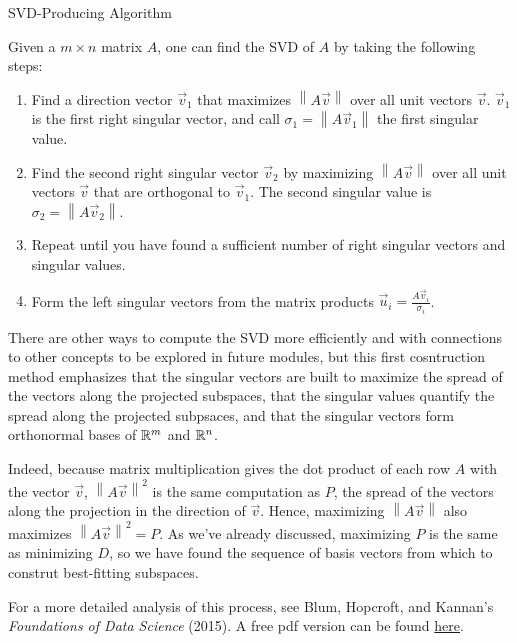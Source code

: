 \documentclass{ximera}
\begin{document}
\begin{theorem}{SVD-Producing Algorithm}

  Given a $m\times n$ matrix $A$, one can find the SVD of $A$ by taking the following steps:

  \begin{enumerate}
    \item Find a direction vector $\vec{v}_1$ that maximizes $\left\|A\vec{v}\right\|$ over all unit vectors $\vec{v}$. $\vec{v}_1$ is the first right singular vector, and call $\sigma_1=\left\|A\vec{v}_1\right\|$ the first singular value. 
    \item Find the second right singular vector $\vec{v}_2$ by maximizing $\left\|A\vec{v}\right\|$ over all unit vectors $\vec{v}$ that are orthogonal to $\vec{v}_1$. The second singular value is $\sigma_2=\left\|A\vec{v}_2\right\|$. 
    \item Repeat until you have found a sufficient number of right singular vectors and singular values.
    \item Form the left singular vectors from the matrix products $\vec{u}_i=\frac{A\vec{v}_i}{\sigma_i}$.
  \end{enumerate}

  There are other ways to compute the SVD more efficiently and with connections to other concepts to be explored in future modules, but this first cosntruction method emphasizes that the singular vectors are built to maximize the spread of the vectors along the projected subspaces, that the singular values quantify the spread along the projected subpsaces, and that the singular vectors form orthonormal bases of $\mathbb{R}^m$ and $\mathbb{R}^n$. 

  Indeed, because matrix multiplication gives the dot product of each row $A$ with the vector $\vec{v}$, $\left\|A\vec{v}\right\|^2$ is the same computation as $P$, the spread of the vectors along the projection in the direction of $\vec{v}$. Hence, maximizing $\left\|A\vec{v}\right\|$ also maximizes $\left\|A\vec{v}\right\|^2=P$. As we've already discussed, maximizing $P$ is the same as minimizing $D$, so we have found the sequence of basis vectors from which to construt best-fitting subspaces.

  For a more detailed analysis of this process, see Blum, Hopcroft, and Kannan's \emph{Foundations of Data Science} (2015). A free pdf version can be found \href{https://www.cs.cornell.edu/jeh/book.pdf}{here}.

\end{theorem}
\end{document}
